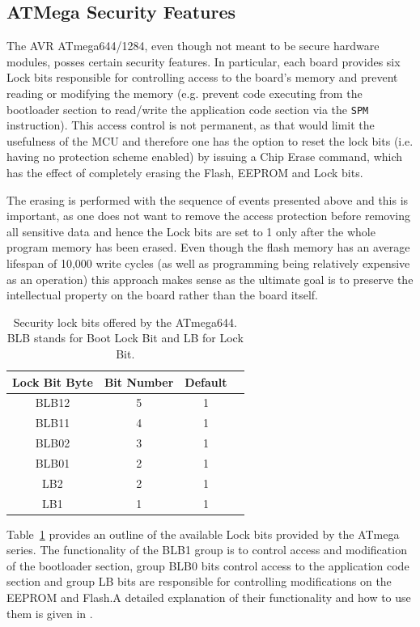 	\subsection{ATMega Security Features}
	
	The AVR ATmega644/1284, even though not meant to be secure hardware modules, posses certain security features. In particular, each board provides six Lock bits responsible for controlling access to the board's memory and prevent reading or modifying the memory (e.g. prevent code executing from the bootloader section to read/write the application code section via the \texttt{SPM} instruction). This access control is not permanent, as that would limit the usefulness of the MCU and therefore one has the option to reset the lock bits (i.e. having no protection scheme enabled) by issuing a Chip Erase command, which has the effect of completely erasing the Flash, EEPROM and Lock bits.
	
	The erasing is performed with the sequence of events presented above and this is important, as one does not want to remove the access protection before removing all sensitive data and hence the Lock bits are set to 1 only after the whole program memory has been erased. Even though the flash memory has an average lifespan of 10,000 write cycles (as well as programming being relatively expensive as an operation) this approach makes sense as the ultimate goal is to preserve the intellectual property on the board rather than the board itself.
	
	\begin{table}
		\caption{\footnotesize Security lock bits offered by the ATmega644. BLB stands for Boot Lock Bit and LB for Lock Bit.}
		\label{table:lock_bits}
		\center
		\begin{tabular}{| c | c | c | c |}
			\hline
			\textbf{Lock Bit Byte} & \textbf{Bit Number} & \textbf{Default}\\
			\hline \hline
			BLB12 & 5 & 1\\
			BLB11 & 4 & 1\\
			BLB02 & 3 & 1\\
			BLB01 & 2 & 1\\
			LB2 & 2 & 1 \\
			LB1 & 1 & 1 \\
			\hline
		\end{tabular}
		
	\end{table}
	
Table~\ref{table:lock_bits}	 provides an outline of the available Lock bits provided by the ATmega series. The functionality of the BLB1 group is to control access and modification of the bootloader section, group BLB0 bits control access to the application code section and group LB bits are responsible for controlling modifications on the EEPROM and Flash.A detailed explanation of their functionality and how to use them is given in \citep{atmega_manual}.
	